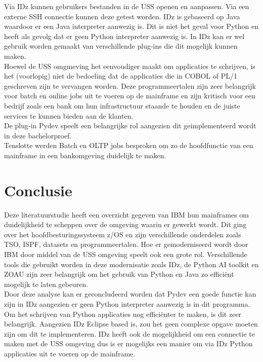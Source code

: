Via IDz kunnen gebruikers bestanden in de USS openen en aanpassen. Via een externe SSH connectie kunnen deze getest worden. IDz is gebaseerd op Java waardoor er een Java interpreter aanwezig is. Dit is niet het geval voor Python en heeft als gevolg dat er geen Python interpreter aanwezig is. In IDz kan er wel gebruik worden gemaakt van verschillende plug-ins die dit mogelijk kunnen maken. \\

Hoewel de USS omgmeving het eenvoudiger maakt om applicaties te schrijven, is het (voorlopig) niet de bedoeling dat de applicaties die in COBOL of PL/1 geschreven zijn te vervangen worden. Deze programmeertalen zijn zeer belangrijk voor batch en online jobs uit te voeren op  de mainframe en zijn kritisch voor een bedrijf zoals een bank om hun infrastructuur staande te houden en de juiste services te kunnen bieden aan de klanten. \\

De plug-in Pydev speelt een belangrijke rol aangezien dit geimplementeerd wordt in deze bachelorproef. \\

Tenslotte werden Batch en OLTP jobs besproken om zo de hoofdfunctie van een mainframe in een bankomgeving duidelijk te maken.\\

\newpage
\section{Conclusie}
Deze literatuurstudie heeft een overzicht gegeven van IBM hun mainframes om duidelijkheid te scheppen over de omgeving waarin er gewerkt wordt. Dit ging over het hoofdbesturingssysteem z/OS en zijn verschillende onderdelen zoals TSO, ISPF, datasets en programmeertalen. Hoe er gemoderniseerd wordt door IBM door middel van de USS omgeving speelt ook een grote rol. Verschillende tools die gebruikt worden in deze modernisatie zoals IDz, de Python AI toolkit en ZOAU zijn zeer belangrijk om het gebruik van Python en Java zo efficiënt mogelijk te laten gebeuren. \\

Door deze analyse kan er geconcludeerd worden dat Pydev een goede functie kan zijn in IDz aangezien er geen Python interpreter aanwezig is in dit programma. Om het schrijven van Python applicaties nog efficiënter te maken, is dit zeer belangrijk. Aangezien IDz Eclipse based is, zou het geen complexe opgave moeten zijn om dit te implementeren. IDz heeft ook de mogelijkheid om een connectie te maken met de USS omgeving dus is er mogelijks een manier om via IDz Python applicaties uit te voeren op de mainframe. \\

